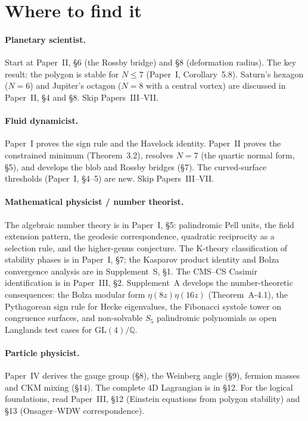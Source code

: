 \section{Where to find it}

\paragraph{Planetary scientist.}
Start at Paper~II, \S6 (the Rossby bridge) and \S8
(deformation radius).
The key result: the polygon is stable for $N \le 7$
(Paper~I, Corollary~5.8).
Saturn's hexagon ($N = 6$) and Jupiter's octagon ($N = 8$
with a central vortex) are discussed in Paper~II, \S4 and \S8.
Skip Papers~III--VII.

\paragraph{Fluid dynamicist.}
Paper~I proves the sign rule and the Havelock identity.
Paper~II proves the constrained minimum (Theorem~3.2),
resolves $N = 7$ (the quartic normal form, \S5),
and develops the blob and Rossby bridges (\S7).
The curved-surface thresholds (Paper~I, \S4--5) are new.
Skip Papers~III--VII.

\paragraph{Mathematical physicist / number theorist.}
The algebraic number theory is in Paper~I, \S5:
palindromic Pell units, the field extension pattern,
the geodesic correspondence, quadratic reciprocity
as a selection rule, and the higher-genus conjecture.
The K-theory classification of stability phases is in
Paper~I, \S7; the Kasparov product identity and Bolza
convergence analysis are in Supplement~S, \S1.
The CMS--CS Casimir identification is in Paper~III, \S2.
Supplement~A develops the number-theoretic consequences:
the Bolza modular form $\eta(8z)\eta(16z)$
(Theorem~A-4.1), the Pythagorean sign rule for Hecke
eigenvalues, the Fibonacci systole tower on congruence
surfaces, and non-solvable $S_5$ palindromic polynomials
as open Langlands test cases for
$\mathrm{GL}(4)/\mathbb{Q}$.

\paragraph{Particle physicist.}
Paper~IV derives the gauge group (\S8), the Weinberg angle
(\S9), fermion masses and CKM mixing (\S14).
The complete $4$D Lagrangian is in \S12.
For the logical foundations, read Paper~III, \S12
(Einstein equations from polygon stability) and \S13
(Onsager--WDW correspondence).

